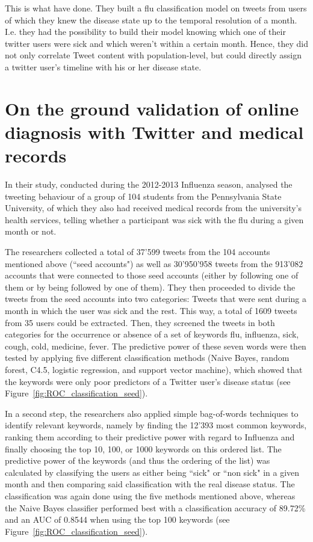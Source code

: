 \documentclass[11pt, a4paper,twoside]{report}\usepackage[]{graphicx}\usepackage[]{color}
\begin{document}
This is what \cite{bodnar_ground_2014} have done. They built a flu classification model on tweets from users of which they knew the disease state up to the temporal resolution of a month. I.e. they had the possibility to build their model knowing which one of their twitter users were sick and which weren't within a certain month. Hence, they did not only correlate Tweet content with population-level, but could directly assign a twitter user's timeline with his or her disease state.\newline

\section{On the ground validation of online diagnosis with Twitter and medical records}
In their study, conducted during the 2012-2013 Influenza season, \cite{bodnar_ground_2014} analysed the tweeting behaviour of a group of 104 students from the Pennsylvania State University, of which they also had received medical records from the university's health services, telling whether a participant was sick with the flu during a given month or not.\newline

The researchers collected a total of 37'599 tweets from the 104 accounts mentioned above (``seed accounts") as well as 30'950'958 tweets from the 913'082 accounts that were connected to those seed accounts (either by following one of them or by being followed by one of them). They then proceeded to divide the tweets from the seed accounts into two categories: Tweets that were sent during a month in which the user was sick and the rest. This way, a total of 1609 tweets from 35 users could be extracted. 
Then, they screened the tweets in both categories for the occurrence or absence of a set of keywords {flu, influenza, sick, cough, cold, medicine, fever}. The predictive power of these seven words were then tested by applying five different classification methods (Naive Bayes, random forest, C4.5, logistic regression, and support vector machine), which showed that the keywords were only poor predictors of a Twitter user's disease status (see Figure~\ref{fig:ROC_classification_seed}).\newline

In a second step, the researchers also applied simple bag-of-words techniques to identify relevant keywords, namely by finding the 12'393 most common keywords, ranking them according to their predictive power with regard to Influenza and finally choosing the top 10, 100, or 1000 keywords on this ordered list. The predictive power of the keywords (and thus the ordering of the list) was calculated by classifying the users as either being ``sick" or ``non sick" in a given month and then comparing said classification with the real disease status. The classification was again done using the five methods mentioned above, whereas the Naive Bayes classifier performed best with a classification accuracy of 89.72\% and an AUC of 0.8544 when using the top 100 keywords (see Figure~\ref{fig:ROC_classification_seed}).
\end{document}
